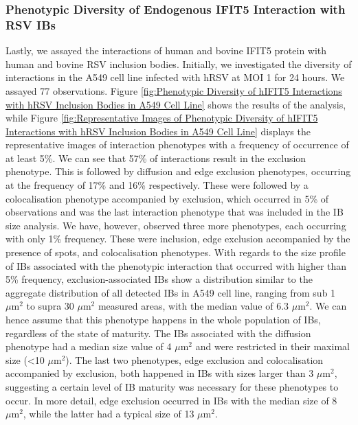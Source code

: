 \subsubsection{Phenotypic Diversity of Endogenous IFIT5 Interaction with RSV IBs}
Lastly, we assayed the interactions of human and bovine IFIT5 protein with human and bovine RSV inclusion bodies. Initially, we investigated the diversity of interactions in the A549 cell line infected with hRSV at MOI 1 for 24 hours. We assayed 77 observations. Figure \ref{fig:Phenotypic Diversity of hIFIT5 Interactions with hRSV Inclusion Bodies in A549 Cell Line} shows the results of the analysis, while Figure \ref{fig:Representative Images of Phenotypic Diversity of hIFIT5 Interactions with hRSV Inclusion Bodies in A549 Cell Line} displays the representative images of interaction phenotypes with a frequency of occurrence of at least 5\%. We can see that 57\% of interactions result in the exclusion phenotype. This is followed by diffusion and edge exclusion phenotypes, occurring at the frequency of 17\% and 16\% respectively. These were followed by a colocalisation phenotype accompanied by exclusion, which occurred in 5\% of observations and was the last interaction phenotype that was included in the IB size analysis. We have, however, observed three more phenotypes, each occurring with only 1\% frequency. These were inclusion, edge exclusion accompanied by the presence of spots, and colocalisation phenotypes. With regards to the size profile of IBs associated with the phenotypic interaction that occurred with higher than 5\% frequency, exclusion-associated IBs show a distribution similar to the aggregate distribution of all detected IBs in A549 cell line, ranging from sub 1 \(\mu \mbox{m}^2\) to supra 30 \(\mu \mbox{m}^2\) measured areas, with the median value of 6.3 \(\mu \mbox{m}^2\). We can hence assume that this phenotype happens in the whole population of IBs, regardless of the state of maturity. The IBs associated with the diffusion phenotype had a median size value of 4 \(\mu \mbox{m}^2\) and were restricted in their maximal size (<10 \(\mu \mbox{m}^2\)). The last two phenotypes, edge exclusion and colocalisation accompanied by exclusion, both happened in IBs with sizes larger than 3 \(\mu \mbox{m}^2\), suggesting a certain level of IB maturity was necessary for these phenotypes to occur. In more detail, edge exclusion occurred in IBs with the median size of 8 \(\mu \mbox{m}^2\), while the latter had a typical size of 13 \(\mu \mbox{m}^2\).

